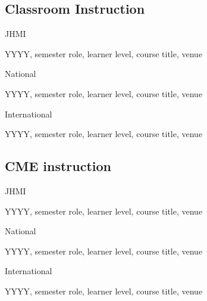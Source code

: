 \documentclass[11pt]{article}
\newenvironment{lyxlist}[1]
	{\begin{list}{}
		{\setlength\itemsep{-0.5ex}
		\settowidth{\labelwidth}{#1}
		 \setlength{\leftmargin}{\labelwidth}
		 \addtolength{\leftmargin}{\labelsep}
		 \renewcommand{\makelabel}[1]{##1\hfil}}}
	{\end{list}}
\begin{document}
\subsection*{Classroom Instruction}
\begin{lyxlist}{2020 (Winter, virtual)}

\item[{\textcolor{color1}{JHMI}}]

\item[{YYYY, semester}]role, learner level, course title, venue

\item[{\textcolor{color1}{National}}]

\item[{YYYY, semester}]role, learner level, course title, venue

\item[{\textcolor{color1}{International}}]
\item[{YYYY, semester}]role, learner level, course title, venue

\end{lyxlist}

\subsection*{CME instruction}
\begin{lyxlist}{2020 (Winter, virtual)}

\item[{\textcolor{color1}{JHMI}}]

\item[{YYYY, semester}]role, learner level, course title, venue

\item[{\textcolor{color1}{National}}]

\item[{YYYY, semester}]role, learner level, course title, venue

\item[{\textcolor{color1}{International}}]
\item[{YYYY, semester}]role, learner level, course title, venue

\end{lyxlist}
\end{document}
